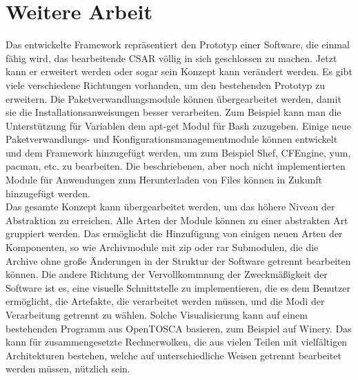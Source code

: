 \section*{Weitere Arbeit}
Das entwickelte Framework repräsentiert den Prototyp einer Software, die einmal fähig wird, das bearbeitende CSAR völlig in sich geschlossen zu machen. 
Jetzt kann er erweitert werden oder sogar sein Konzept kann verändert werden. 
Es gibt viele verschiedene Richtungen vorhanden, um den bestehenden Prototyp zu erweitern. 
Die Paketverwandlungsmodule können übergearbeitet werden, damit sie die Installationsanweisungen besser verarbeiten. 
Zum Beispiel kann man die Unterstützung für Variablen dem apt-get Modul für Bash zuzugeben. 
Einige neue Paketverwandlungs- und Konfigurationsmanagementmodule können entwickelt und dem Framework hinzugefügt werden, um zum Beispiel Shef, CFEngine, yum, pacman, etc. zu bearbeiten. 
Die beschriebenen, aber noch nicht implementierten Module für Anwendungen zum Herunterladen von Files können in Zukunft hinzugefügt werden.\\
Das gesamte Konzept kann übergearbeitet werden, um das höhere Niveau der Abstraktion zu erreichen. 
Alle Arten der Module können zu einer abstrakten Art gruppiert werden. 
Das ermöglicht die Hinzufügung von einigen neuen Arten der Komponenten, so wie Archivmodule mit zip oder rar Submodulen, die die Archive ohne große Änderungen in der Struktur der Software getrennt bearbeiten können. 
Die andere Richtung der Vervollkommnung der Zweckmäßigkeit der Software ist es, eine visuelle Schnittstelle zu implementieren, die es dem Benutzer ermöglicht, die Artefakte, die verarbeitet werden müssen, und die Modi der Verarbeitung getrennt zu wählen. 
Solche Visualisierung kann auf einem bestehenden Programm aus OpenTOSCA basieren, zum Beispiel auf Winery. 
Das kann für zusammengesetzte Rechnerwolken, die aus vielen Teilen mit vielfältigen Architekturen bestehen, welche auf unterschiedliche Weisen getrennt bearbeitet werden müssen, nützlich sein. 
